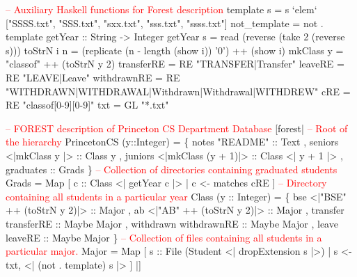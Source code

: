 \begin{code}
\textcolor{red}{-- Auxiliary Haskell functions for Forest description}
template s = s `elem` ["SSSS.txt", "SSS.txt", "sxx.txt", "sss.txt", "ssss.txt"]
not_template = not . template
\mbox{}
getYear :: String -> Integer
getYear s = read (reverse (take 2 (reverse s)))
toStrN i n = (replicate  (n - length (show i)) '0') ++ (show i)
mkClass y = "classof" ++ (toStrN y 2)
\mbox{}
transferRE  = RE "TRANSFER|Transfer"
leaveRE     = RE "LEAVE|Leave"
withdrawnRE = RE "WITHDRAWN|WITHDRAWAL|Withdrawn|Withdrawal|WITHDREW"
cRE         = RE "classof[0-9][0-9]" 
txt         = GL "*.txt"
\end{code}


\begin{code}
\textcolor{red}{-- FOREST description of Princeton CS Department Database}
[forest|
  \textcolor{red}{-- Root of the hierarchy}
   PrincetonCS (y::Integer) = 
    \{ notes  "README" :: Text
    , seniors    <|mkClass y      |> :: Class y
    , juniors    <|mkClass (y + 1)|> :: Class <| y + 1 |>
    , graduates :: Grads
    \}
\mbox{}
  \textcolor{red}{-- Collection of directories containing graduated students}
   Grads = 
     Map [ c :: Class <| getYear c |> | c <- matches cRE ] 
\mbox{}
  \textcolor{red}{-- Directory containing all students in a particular year}
   Class (y :: Integer) = 
    \{ bse  <|"BSE" ++ (toStrN y 2)|> :: Major
    , ab   <|"AB"  ++ (toStrN y 2)|> :: Major   
    , transfer   transferRE  :: Maybe Major 
    , withdrawn  withdrawnRE :: Maybe Major 
    , leave      leaveRE     :: Maybe Major 
    \}
\mbox{}
  \textcolor{red}{-- Collection of files containing all students in a particular major.}
   Major = Map 
    [ s :: File (Student <| dropExtension s |>) 
    | s <-  txt,  <| (not . template) s |>  ]  
|]
\end{code}
\vfill{}